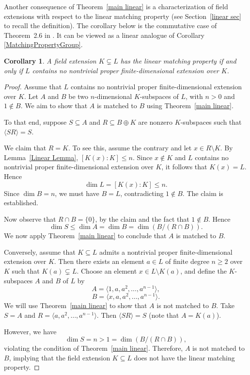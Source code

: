 \documentclass[11pt]{amsart}
\newtheorem{corollary}[theorem]{Corollary}
\theoremstyle{definition}
\theoremstyle{remark}
\begin{document}
Another consequence of Theorem~\ref{main linear} is a characterization of field extensions with respect to the linear matching property (see Section~\ref{linear sec} to recall the definition).  The corollary below is the commutative case of Theorem~2.6 in \cite{Eliahou 2}. It can be viewed as a linear analogue of Corollary \ref{MatchingPropertyGroup}.


\begin{corollary} \label{linear match prop}
    A field extension $K\subsetneq L$ has the linear matching property if and only if  $L$ contains no nontrivial proper finite-dimensional extension over $K$.
\end{corollary}

\begin{proof}
Assume that \( L \) contains no nontrivial proper finite-dimensional extension over \( K \). Let \( A \) and \( B \) be two \( n \)-dimensional \( K \)-subspaces of \( L \), with \( n > 0 \) and \( 1 \notin B \). We aim to show that \( A \) is matched to \( B \) using Theorem~\ref{main linear}. 

To that end, suppose \( S \subseteq A \) and \( R \subseteq B \oplus K \) are nonzero \( K \)-subspaces such that \( \langle SR \rangle = S \). 

\medskip

We claim that  \( R = K \). To see this, assume the contrary and let \( x \in R \setminus K \). By Lemma~\ref{Linear Lemma}, \( [K(x):K] \leq n \). Since \( x \notin K \) and \( L \) contains no nontrivial proper finite-dimensional extension over \( K \), it follows that \( K(x) = L \).  Hence
\[
\dim L = [K(x):K] \leq n.
\]
Since \( \dim B = n \), we must have \( B = L \), contradicting \( 1 \notin B \). The claim is established. 

\medskip

Now observe that \( R \cap B = \{ 0 \} \), by the claim and the fact that \( 1 \notin B \). Hence
\[
\dim S \leq \dim A = \dim B = \dim (B/(R \cap B)).
\]
We now apply Theorem~\ref{main linear} to conclude that \( A \) is matched to \( B \).

\medskip

Conversely, assume that \( K \subseteq L \) admits a nontrivial proper finite-dimensional extension over \( K \). Then there exists an element \( a \in L \) of finite degree \( n \geq 2 \) over \( K \) such that \( K(a) \subsetneq L \). Choose an element \( x \in L \setminus K(a) \), and define the \( K \)-subspaces \( A \) and \( B \) of \( L \) by
\[
A = \langle 1, a, a^2, \dots, a^{n-1} \rangle,
\]
\[
B = \langle x, a, a^2, \dots, a^{n-1} \rangle.
\]
We will use Theorem~\ref{main linear} to show that \( A \) is not matched to \( B \). Take \( S = A \) and \( R = \langle a, a^2, \dots, a^{n-1} \rangle \). Then \( \langle SR \rangle = S \) (note that \( A = K(a) \)).

However, we have
\[
\dim S = n > 1 = \dim (B/(R \cap B)),
\]
violating the condition of Theorem~\ref{main linear}. Therefore, \( A \) is not matched to \( B \), implying that the field extension \( K \subseteq L \) does not have the linear matching property.
\end{proof}
\end{document}
